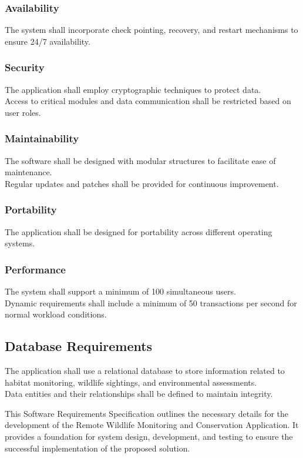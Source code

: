 \documentclass{article}
\begin{document}
\subsubsection{Availability}
The system shall incorporate check pointing, recovery, and restart mechanisms to ensure 24/7 availability.

\subsubsection{Security}
The application shall employ cryptographic techniques to protect data.\\
Access to critical modules and data communication shall be restricted based on user roles.

\subsubsection{Maintainability}
The software shall be designed with modular structures to facilitate ease of maintenance.\\
Regular updates and patches shall be provided for continuous improvement.

\subsubsection{Portability}
The application shall be designed for portability across different operating systems.

\subsubsection{Performance}
The system shall support a minimum of 100 simultaneous users.\\
Dynamic requirements shall include a minimum of 50 transactions per second for normal workload conditions.

\subsection{Database Requirements}
The application shall use a relational database to store information related to habitat monitoring, wildlife sightings, and environmental assessments.\\
Data entities and their relationships shall be defined to maintain integrity.

This Software Requirements Specification outlines the necessary details for the development of the Remote Wildlife Monitoring and Conservation Application. It provides a foundation for system design, development, and testing to ensure the successful implementation of the proposed solution.
\end{document}
